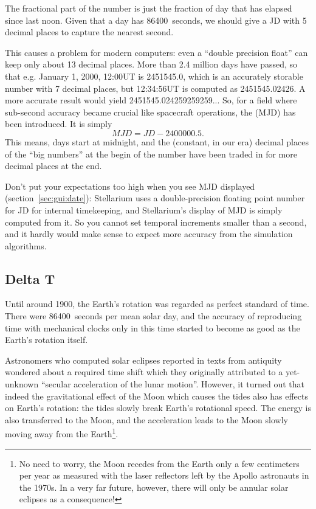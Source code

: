 The fractional part of the number is just the fraction of day that has
elapsed since last noon. Given that a day has 86400~seconds, we should
give a JD with 5 decimal places to capture the nearest second.

This causes a problem for modern computers: even a ``double precision
float'' can keep only about 13 decimal places. More than 2.4 million
days have passed, so that e.g. January 1, 2000, 12:00UT is 2451545.0,
which is an accurately storable number with 7 decimal places, but 12:34:56UT is computed as
2451545.02426. A more accurate result would yield
2451545.024259259259... So, for a field where sub-second accuracy
became crucial like spacecraft operations, the  (MJD) has been introduced. It is simply
\begin{equation}
  \label{eq:MJD}
  MJD=JD-2400000.5. 
\end{equation}
This means, days start at midnight, and the (constant, in our era)
decimal places of the ``big numbers'' at the begin of the number have
been traded in for more decimal places at the end. 

Don't put your expectations too high when you see MJD displayed
(section~\ref{sec:gui:date}): Stellarium uses a double-precision
floating point number for JD for internal timekeeping, and Stellarium's
display of MJD is simply computed from it. So you cannot set temporal
increments smaller than a second, and it hardly would make sense to
expect more accuracy from the simulation algorithms.


\subsection{Delta T}
\label{sec:Concepts:DeltaT}

Until around 1900, the Earth's rotation was regarded as perfect
standard of time. There were 86400~seconds per mean solar day, and the
accuracy of reproducing time with mechanical clocks only in this time
started to become as good as the Earth's rotation itself.

Astronomers who computed solar eclipses reported in texts from
antiquity wondered about a required time shift which they originally
attributed to a yet-unknown ``secular acceleration of the lunar
motion''. However, it turned out that indeed the gravitational effect
of the Moon which causes the tides also has effects on Earth's
rotation: the tides slowly break Earth's rotational speed. The energy
is also transferred to the Moon, and the acceleration leads to the
Moon slowly moving away from the Earth\footnote{No need to worry, the
  Moon recedes from the Earth only a few centimeters per year as
  measured with the laser reflectors left by the Apollo astronauts in
  the 1970s. In a very far future, however, there will only be annular
  solar eclipses as a consequence!}.

